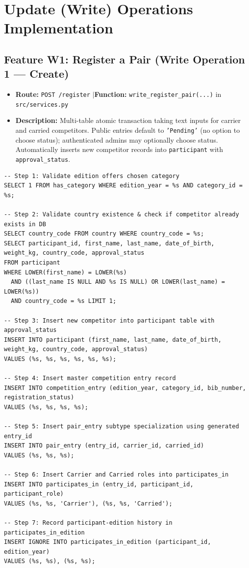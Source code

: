 \documentclass[11pt,a4paper]{article}
\begin{document}
\newpage

\section{Update (Write) Operations Implementation}

\subsection{Feature W1: Register a Pair (Write Operation 1 --- Create)}
\begin{itemize}[leftmargin=1.5em, itemsep=0.5pt, topsep=0.5pt]
  \item \textbf{Route:} \texttt{POST /register} \quad$\vert$\quad \textbf{Function:} \texttt{write\_register\_pair(...)} in \texttt{src/services.py}
  \item \textbf{Description:} Multi-table atomic transaction taking text inputs for carrier and carried competitors. Public entries default to \texttt{'Pending'} (no option to choose status); authenticated admins may optionally choose status. Automatically inserts new competitor records into \texttt{participant} with \texttt{approval\_status}.
\end{itemize}

\begin{lstlisting}
-- Step 1: Validate edition offers chosen category
SELECT 1 FROM has_category WHERE edition_year = %s AND category_id = %s;

-- Step 2: Validate country existence & check if competitor already exists in DB
SELECT country_code FROM country WHERE country_code = %s;
SELECT participant_id, first_name, last_name, date_of_birth, weight_kg, country_code, approval_status 
FROM participant 
WHERE LOWER(first_name) = LOWER(%s) 
  AND ((last_name IS NULL AND %s IS NULL) OR LOWER(last_name) = LOWER(%s))
  AND country_code = %s LIMIT 1;

-- Step 3: Insert new competitor into participant table with approval_status
INSERT INTO participant (first_name, last_name, date_of_birth, weight_kg, country_code, approval_status)
VALUES (%s, %s, %s, %s, %s, %s);

-- Step 4: Insert master competition entry record
INSERT INTO competition_entry (edition_year, category_id, bib_number, registration_status)
VALUES (%s, %s, %s, %s);

-- Step 5: Insert pair_entry subtype specialization using generated entry_id
INSERT INTO pair_entry (entry_id, carrier_id, carried_id)
VALUES (%s, %s, %s);

-- Step 6: Insert Carrier and Carried roles into participates_in
INSERT INTO participates_in (entry_id, participant_id, participant_role)
VALUES (%s, %s, 'Carrier'), (%s, %s, 'Carried');

-- Step 7: Record participant-edition history in participates_in_edition
INSERT IGNORE INTO participates_in_edition (participant_id, edition_year)
VALUES (%s, %s), (%s, %s);
\end{lstlisting}
\end{document}
